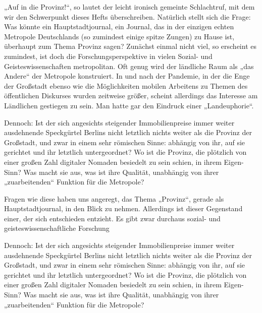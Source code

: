 
\begin{multicols*}{2}
\noindent „Auf in die Provinz!“, so lautet der leicht ironisch gemeinte Schlachtruf, mit dem wir den Schwerpunkt dieses Hefts überschreiben. Natürlich stellt sich die Frage: Was könnte ein Hauptstadtjournal, ein Journal, das in der einzigen echten Metropole Deutschlands (so zumindest einige spitze Zungen) zu Hause ist, überhaupt zum Thema Provinz sagen?
Zunächst einmal nicht viel, so erscheint es zumindest, ist doch die Forschungsperspektive in vielen Sozial- und Geisteswissenschaften metropolitan. Oft genug wird der ländliche Raum als „das Andere“ der Metropole kon­struiert. In und nach der Pandemie, in der die Enge der Großstadt ebenso wie die Möglichkeiten mobilen Arbeitens zu Themen des öffentlichen Diskurses wurden zeitweise größer, scheint allerdings das Interesse am Ländlichen gestiegen zu sein. Man hatte gar den Eindruck einer „Landeuphorie“.

Dennoch: Ist der sich angesichts steigender Immobilienpreise immer weiter ausdehnende Speckgürtel Berlins nicht letztlich nichts weiter als die Provinz der Großstadt, und zwar in einem sehr römischen Sinne: abhängig von ihr, auf sie gerichtet und ihr letztlich untergeordnet? Wo ist die Provinz, die plötzlich von einer großen Zahl digitaler Nomaden besiedelt zu sein schien, in ihrem Eigen-Sinn? Was macht sie aus, was ist ihre Qualität, unabhängig von ihrer „zuarbeitenden“ Funktion für die Metropole?

Fragen wie diese haben uns angeregt, das Thema „Provinz“, gerade als Hauptstadtjournal, in den Blick zu nehmen. Allerdings ist dieser Gegenstand einer, der sich entschieden entzieht. Es gibt zwar durchaus sozial- und geisteswissenschaftliche Forschung 

Dennoch: Ist der sich angesichts steigender Immobilienpreise immer weiter ausdehnende Speckgürtel Berlins nicht letztlich nichts weiter als die Provinz der Großstadt, und zwar in einem sehr römischen Sinne: abhängig von ihr, auf sie gerichtet und ihr letztlich untergeordnet? Wo ist die Provinz, die plötzlich von einer großen Zahl digitaler Nomaden besiedelt zu sein schien, in ihrem Eigen-Sinn? Was macht sie aus, was ist ihre Qualität, unabhängig von ihrer „zuarbeitenden“ Funktion für die Metropole?


\end{multicols*}
